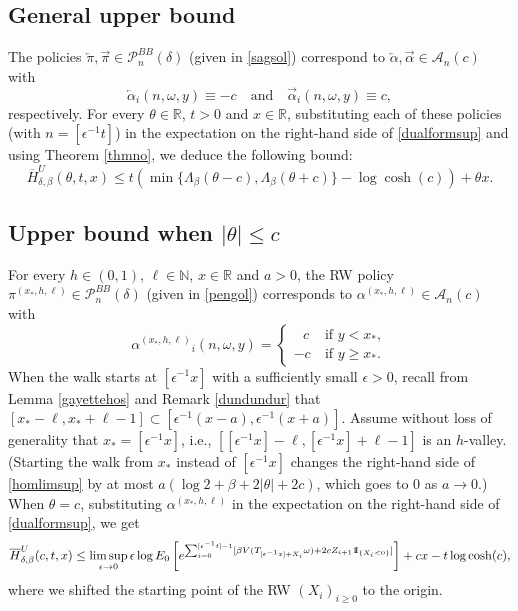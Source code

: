 \documentclass[a4paper]{amsart}
\numberwithin{equation}{section}
\theoremstyle{plain}
\theoremstyle{remark}
\begin{document}
\subsection{General upper bound}

The policies ${\overleftarrow\pi},{\overrightarrow\pi}\in\mathcal{P}_n^{BB}(\delta)$ (given in \eqref{sagsol}) correspond to ${\overleftarrow\alpha},{\overrightarrow\alpha}\in\mathcal{A}_n(c)$ with
$${\overleftarrow\alpha}_i(n,\omega,y) \equiv -c\quad\text{and}\quad{\overrightarrow\alpha}_i(n,\omega,y) \equiv c,$$
respectively. For every $\theta\in\mathbb{R}$, $t>0$ and $x\in\mathbb{R}$, substituting each of these policies (with $n=[{\epsilon^{-1}} t]$) in the expectation on the right-hand side of \eqref{dualformsup} and using Theorem \ref{thmno}, we deduce the following bound:
\begin{equation}\label{UBpart1}
\overline H_{\delta,\beta}^U(\theta,t,x) \le t\left(\min\{\Lambda_\beta(\theta - c), \Lambda_\beta(\theta + c)\} - \log\cosh(c)\right) + \theta x.
\end{equation}

\subsection{Upper bound when $|\theta| \le c$}\label{cinsisimhay}

For every $h\in(0,1)$, $\ell\in\mathbb{N}$, $x\in\mathbb{R}$ and $a>0$, the RW policy ${\pi^{(x_*,h,\ell)}}\in\mathcal{P}_n^{BB}(\delta)$ (given in \eqref{pengol}) 
corresponds to ${\alpha^{(x_*,h,\ell)}}\in\mathcal{A}_n(c)$ with
$${\alpha^{(x_*,h,\ell)}}_i(n,\omega,y) = \begin{cases}\ \; \,c&\ \text{if $y < x_*$},\\
-c&\ \text{if $y \ge x_*$}.\end{cases}$$
When the walk starts at $[{\epsilon^{-1}} x]$ with a sufficiently small ${\epsilon}>0$, recall from Lemma \ref{gayettehos} and Remark \ref{dundundur} that $[x_*-\ell,x_*+\ell-1]\subset[{\epsilon^{-1}}(x-a),{\epsilon^{-1}}(x+a)]$. 
Assume without loss of generality that $x_* = [{\epsilon^{-1}} x]$, i.e., $[[{\epsilon^{-1}} x]-\ell,[{\epsilon^{-1}} x] + \ell-1]$ is an $h$-valley. (Starting the walk from $x_*$ instead of $[{\epsilon^{-1}} x]$ changes the right-hand side of \eqref{homlimsup} by at most $a(\log 2 + \beta + 2|\theta| + 2c)$, which goes to $0$ as $a\to0$.) When $\theta = c$, substituting ${\alpha^{(x_*,h,\ell)}}$ in the expectation on the right-hand side of \eqref{dualformsup}, we get
\begin{equation}\label{gazagel}
	\overline H_{\delta,\beta}^U(c,t,x) \le \limsup_{{\epsilon}\to0}{\epsilon}\log E_0\left[e^{\sum_{i=0}^{[{\epsilon^{-1}} t]-1} [\beta V(T_{[{\epsilon^{-1}} x] + X_i}\omega) + 2cZ_{i+1}{{{\rm 1\mkern-1.5mu}\!{\rm I}}}_{\{X_i < 0\}}]}\right] + cx - t\log\cosh(c),
\end{equation}
where we shifted the starting point of the RW $(X_i)_{i\ge0}$ to the origin.
\end{document}
